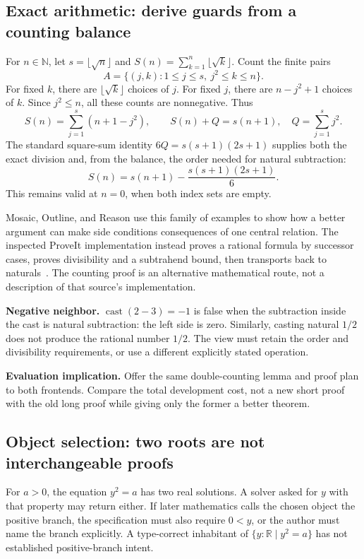 \documentclass[11pt,letterpaper]{article}
\newcommand{\R}{\mathbb R}
\newcommand{\N}{\mathbb N}
\begin{document}
\subsection{Exact arithmetic: derive guards from a counting balance}
For \(n\in\N\), let \(s=\lfloor\sqrt n\rfloor\) and
\(S(n)=\sum_{k=1}^{n}\lfloor\sqrt k\rfloor\). Count the finite pairs
\[
 A=\{(j,k):1\leq j\leq s,\ j^2\leq k\leq n\}.
\]
For fixed \(k\), there are \(\lfloor\sqrt k\rfloor\) choices of \(j\).
For fixed \(j\), there are \(n-j^2+1\) choices of \(k\). Since \(j^2\leq n\),
all these counts are nonnegative. Thus
\[
 S(n)=\sum_{j=1}^{s}(n+1-j^2),\qquad
 S(n)+Q=s(n+1),\quad Q=\sum_{j=1}^{s}j^2.
\]
The standard square-sum identity \(6Q=s(s+1)(2s+1)\) supplies both the exact
division and, from the balance, the order needed for natural subtraction:
\[
 S(n)=s(n+1)-\frac{s(s+1)(2s+1)}6.
\]
This remains valid at \(n=0\), when both index sets are empty.

Mosaic, Outline, and Reason use this family of examples to show how a better
argument can make side conditions consequences of one central relation. The
inspected ProveIt implementation instead proves a rational formula by successor
cases, proves divisibility and a subtrahend bound, then transports back to
naturals~\cite{p-sqrt}. The counting proof is an alternative mathematical route,
not a description of that source's implementation.

\textbf{Negative neighbor.} \(\operatorname{cast}(2-3)=-1\) is false when the
subtraction inside the cast is natural subtraction: the left side is zero.
Similarly, casting natural \(1/2\) does not produce the rational number
\(1/2\). The view must retain the order and divisibility requirements, or use
a different explicitly stated operation.

\textbf{Evaluation implication.} Offer the same double-counting lemma and proof
plan to both frontends. Compare the total development cost, not a new short
proof with the old long proof while giving only the former a better theorem.

\subsection{Object selection: two roots are not interchangeable proofs}
For \(a>0\), the equation \(y^2=a\) has two real solutions. A solver asked for
\(y\) with that property may return either. If later mathematics calls the
chosen object the positive branch, the specification must also require
\(0<y\), or the author must name the branch explicitly. A type-correct inhabitant
of \(\{y:\R\mid y^2=a\}\) has not established positive-branch intent.
\end{document}

